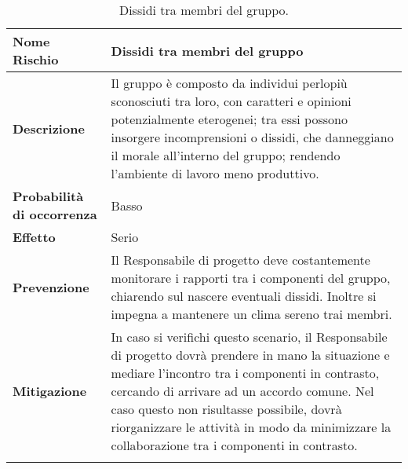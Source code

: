 \documentclass[../PianoDiProgetto.tex]{subfiles}
\begin{document}
		\begin{table}[H]
				\center
				\begin{tabularx}{\textwidth}{X X}
					\noalign{\hrule height 1.5pt}
					\textbf{Nome Rischio} &  Dissidi tra membri del gruppo \\
					\hline
					\textbf{Descrizione}  &  Il gruppo è composto da individui perlopiù sconosciuti tra loro, con caratteri e opinioni potenzialmente eterogenei; tra essi possono insorgere
incomprensioni o dissidi, che danneggiano il morale all'interno del gruppo; rendendo l'ambiente
di lavoro meno produttivo. \\
					\hline
					\textbf{Probabilità di occorrenza}  & Basso \\
					\hline
					\textbf{Effetto}  &  Serio \\
					\hline
					\textbf{Prevenzione}  & Il Responsabile di progetto deve costantemente
monitorare i rapporti tra i componenti del gruppo, chiarendo sul nascere eventuali dissidi. Inoltre si impegna a mantenere un clima sereno trai membri.  \\
					\hline
					\textbf{Mitigazione}  & In caso si verifichi questo scenario, il Responsabile di progetto dovrà prendere in mano la situazione e mediare l'incontro tra i componenti
in contrasto, cercando di arrivare ad un accordo
comune. Nel caso questo non risultasse possibile, dovrà riorganizzare le attività in modo da
minimizzare la collaborazione tra i componenti in contrasto.  \\
					\noalign{\hrule height 1.5pt}
			\end{tabularx}
			\caption{Dissidi tra membri del gruppo.  \label{tab:table_label}}
		\end{table}
		
\end{document}
